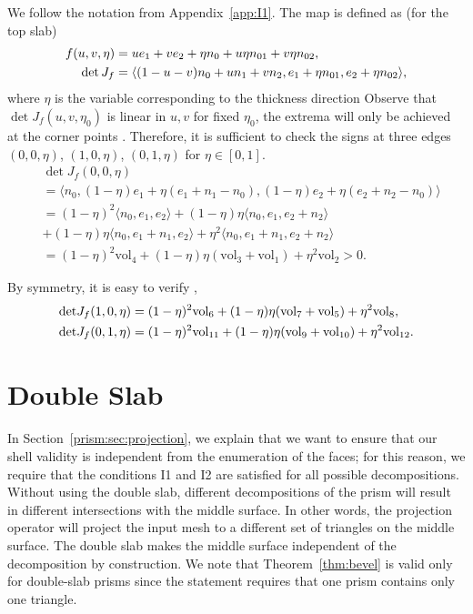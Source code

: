 We follow the notation from {Appendix~\ref{app:I1}.} 
The map is defined as (for the top slab)
\begin{align*}
    f(u,v,\eta) &= u e_1 + v e_2  + \eta n_0 + u \eta n_{01} +
    v \eta n_{02},\\
    \det J_f &=  \langle (1-u-v) n_0 + u n_1 + v n_2, e_1 + \eta n_{01},
    e_2 + \eta n_{02} \rangle,
\end{align*}
where $\eta$ is the variable corresponding to the thickness direction
Observe that $\det J_f(u,v,\eta_0)$ is linear in $u,v$ for fixed $\eta_0$, the extrema will only be achieved at the corner points \cite{knabner2001invertibility}. Therefore, it is sufficient to check the signs at three edges
$(0,0,\eta)$, $(1,0,\eta)$, $(0,1,\eta)$ for $\eta \in [0,1]$.
\begin{align*}
    & \det J_f(0,0,\eta) \\
    &= \langle n_0, (1-\eta)e_1 +\eta (e_1 + n_1 - n_0),(1-\eta)e_2 +\eta (e_2 + n_2 - n_0) \rangle \\
    &= (1-\eta)^2\langle n_0, e_1, e_2 \rangle + 
    (1-\eta)\eta \langle n_0,e_1, e_2+n_2\rangle \\&+ 
    (1-\eta)\eta \langle n_0, e_1+n_1, e_2\rangle + 
    \eta^2\langle n_0, e_1+n_1, e_2 + n_2\rangle\\
    &= (1-\eta)^2 \text{vol}_4 + (1-\eta)\eta (\text{vol}_3 +\text{vol}_1) + \eta^2 \text{vol}_2 > 0.
\end{align*}

By symmetry, 
it is easy to verify ,
\begin{align*}
    \det& J_f(1,0,\eta) = (1-\eta)^2 \text{vol}_6 + (1-\eta)\eta (\text{vol}_7 +\text{vol}_5) + \eta^2 \text{vol}_8, \\
    \det& J_f(0,1,\eta) = (1-\eta)^2 \text{vol}_{11} + (1-\eta)\eta (\text{vol}_9 +\text{vol}_{10}) + \eta^2 \text{vol}_{12}.\\
\end{align*}


\section{Double Slab}\label{app:dblayer}
In Section~\ref{prism:sec:projection}, we explain that we want to ensure that our shell validity is independent from the enumeration of the faces; for this reason, we require that the conditions I1 and I2 are satisfied for all possible decompositions. Without using the double slab, different decompositions of the prism will result in  different intersections with the middle surface. In other words, the projection operator will project the input mesh to a different set of triangles on the middle surface. 
The double slab makes the middle surface independent of the decomposition by construction. 
We note that Theorem~\ref{thm:bevel} is valid only for double-slab prisms since the statement requires that one prism contains only one triangle.

